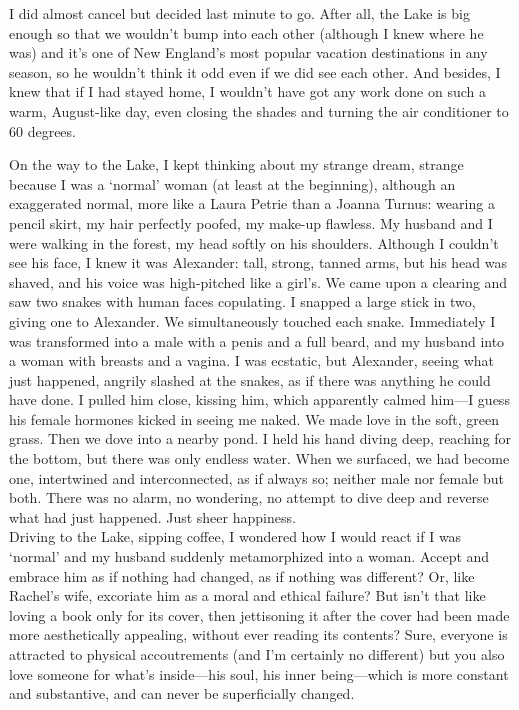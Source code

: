 I did almost cancel but decided last minute to go. After all, the Lake
is big enough so that we wouldn't bump into each other (although I knew
where he was) and it's one of New England's most popular vacation
destinations in any season, so he wouldn't think it odd even if we did
see each other. And besides, I knew that if I had stayed home, I
wouldn't have got any work done on such a warm, August-like day, even
closing the shades and turning the air conditioner to 60 degrees.

On the way to the Lake, I kept thinking about my strange dream, strange
because I was a `normal' woman (at least at the beginning), although an
exaggerated normal, more like a Laura Petrie than a Joanna Turnus:
wearing a pencil skirt, my hair perfectly poofed, my make-up flawless.
My husband and I were walking in the forest, my head softly on his
shoulders. Although I couldn't see his face, I knew it was Alexander:
tall, strong, tanned arms, but his head was shaved, and his voice was
high-pitched like a girl's. We came upon a clearing and saw two snakes
with human faces copulating. I snapped a large stick in two, giving one
to Alexander. We simultaneously touched each snake. Immediately I was
transformed into a male with a penis and a full beard, and my husband
into a woman with breasts and a vagina. I was ecstatic, but Alexander,
seeing what just happened, angrily slashed at the snakes, as if there
was anything he could have done. I pulled him close, kissing him, which
apparently calmed him---I guess his female hormones kicked in seeing me
naked. We made love in the soft, green grass. Then we dove into a nearby
pond. I held his hand diving deep, reaching for the bottom, but there
was only endless water. When we surfaced, we had become one, intertwined
and interconnected, as if always so; neither male nor female but both.
There was no alarm, no wondering, no attempt to dive deep and reverse
what had just happened. Just sheer happiness.\\

Driving to the Lake, sipping coffee, I wondered how I would react if I
was `normal' and my husband suddenly metamorphized into a woman. Accept
and embrace him as if nothing had changed, as if nothing was different?
Or, like Rachel's wife, excoriate him as a moral and ethical failure?
But isn't that like loving a book only for its cover, then jettisoning
it after the cover had been made more aesthetically appealing, without
ever reading its contents? Sure, everyone is attracted to physical
accoutrements (and I'm certainly no different) but you also love someone
for what's inside---his soul, his inner being---which is more constant
and substantive, and can never be superficially changed.

